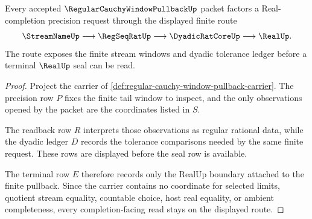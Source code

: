 \begin{theorem}
\label{thm:regular-cauchy-window-pullback-handoff}
Every accepted $\RegularCauchyWindowPullbackUp$ packet factors a Real-completion precision request through the displayed finite route
$$
\StreamNameUp \longrightarrow \RegSeqRatUp \longrightarrow \DyadicRatCoreUp \longrightarrow \RealUp .
$$
The route exposes the finite stream windows and dyadic tolerance ledger before a terminal $\RealUp$ seal can be read.
\end{theorem}
\begin{proof}
Project the carrier of \autoref{def:regular-cauchy-window-pullback-carrier}. The precision row $P$ fixes the finite tail window to inspect, and the only observations opened by the packet are the coordinates listed in $S$.

The readback row $R$ interprets those observations as regular rational data, while the dyadic ledger $D$ records the tolerance comparisons needed by the same finite request. These rows are displayed before the seal row is available.

The terminal row $E$ therefore records only the RealUp boundary attached to the finite pullback. Since the carrier contains no coordinate for selected limits, quotient stream equality, countable choice, host real equality, or ambient completeness, every completion-facing read stays on the displayed route.
\end{proof}

\begin{closurestatus}{\RegularCauchyWindowPullbackUp}
  \theoryclosure{\seedClosure}
  \formalstatus{\unformalizedV}
\end{closurestatus}
